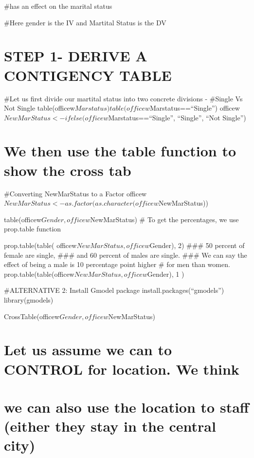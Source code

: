 \documentclass[
]{article}
\begin{document}
\#has an effect on the marital status

\#Here gender is the IV and Martital Status is the DV

\hypertarget{step-1--derive-a-contigency-table}{%
\section{STEP 1- DERIVE A CONTIGENCY
TABLE}\label{step-1--derive-a-contigency-table}}

\#Let us first divide our martital status into two concrete divisions -
\#Single Vs Not Single
table(officew\(Marstatus) table(officew\)Marstatus==``Single'')
officew\(NewMarStatus<- ifelse(officew\)Marstatus==``Single'',
``Single'', ``Not Single'')

\hypertarget{we-then-use-the-table-function-to-show-the-cross-tab}{%
\section{We then use the table function to show the cross
tab}\label{we-then-use-the-table-function-to-show-the-cross-tab}}

\#Converting NewMarStatus to a Factor
officew\(NewMarStatus <- as.factor(as.character(officew\)NewMarStatus))

table(officew\(Gender, officew\)NewMarStatus) \# To get the percentages,
we use prop.table function

prop.table(table( officew\(NewMarStatus,officew\)Gender), 2) \#\#\# 50
percent of female are single, \#\#\# and 60 percent of males are single.
\#\#\# We can say the effect of being a male is 10 percentage point
higher \# for men than women.
prop.table(table(officew\(NewMarStatus, officew\)Gender), 1 )

\#ALTERNATIVE 2: Install Gmodel package install.packages(``gmodels'')
library(gmodels)

CrossTable(officew\(Gender, officew\)NewMarStatus)

\hypertarget{let-us-assume-we-can-to-control-for-location.-we-think}{%
\section{Let us assume we can to CONTROL for location. We
think}\label{let-us-assume-we-can-to-control-for-location.-we-think}}

\hypertarget{we-can-also-use-the-location-to-staff-either-they-stay-in-the-central-city}{%
\section{we can also use the location to staff (either they stay in the
central
city)}\label{we-can-also-use-the-location-to-staff-either-they-stay-in-the-central-city}}
\end{document}
